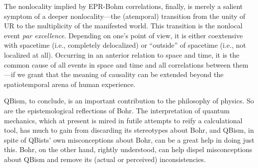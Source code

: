 \documentclass[smallextended]{svjour3}
\begin{document}
The nonlocality implied by EPR-Bohm correlations, finally, is merely a salient symptom of a deeper nonlocality---the (atemporal) transition from the unity of UR to the multiplicity of the manifested world. This transition is the nonlocal event \emph{par excellence}. Depending on one's point of view, it is either coextensive with spacetime (i.e., completely delocalized) or ``outside'' of spacetime (i.e., not localized at all). Occurring in an anterior relation to space and time, it is the common cause of all events in space and time and all correlations between them---if we grant that the meaning of causality can be extended beyond the spatiotemporal arena of human experience.

QBism, to conclude, is an important contribution to the philosophy of physics. So are the epistemological reflections of Bohr. The interpretation of quantum mechanics, which at present is mired in futile attempts to reify a calculational tool, has much to gain from discarding its stereotypes about Bohr, and QBism, in spite of QBists' own misconceptions about Bohr, can be a great help in doing just this. Bohr, on the other hand, rightly understood, can help dispel misconceptions about QBism and remove its (actual or perceived) inconsistencies.
\end{document}
